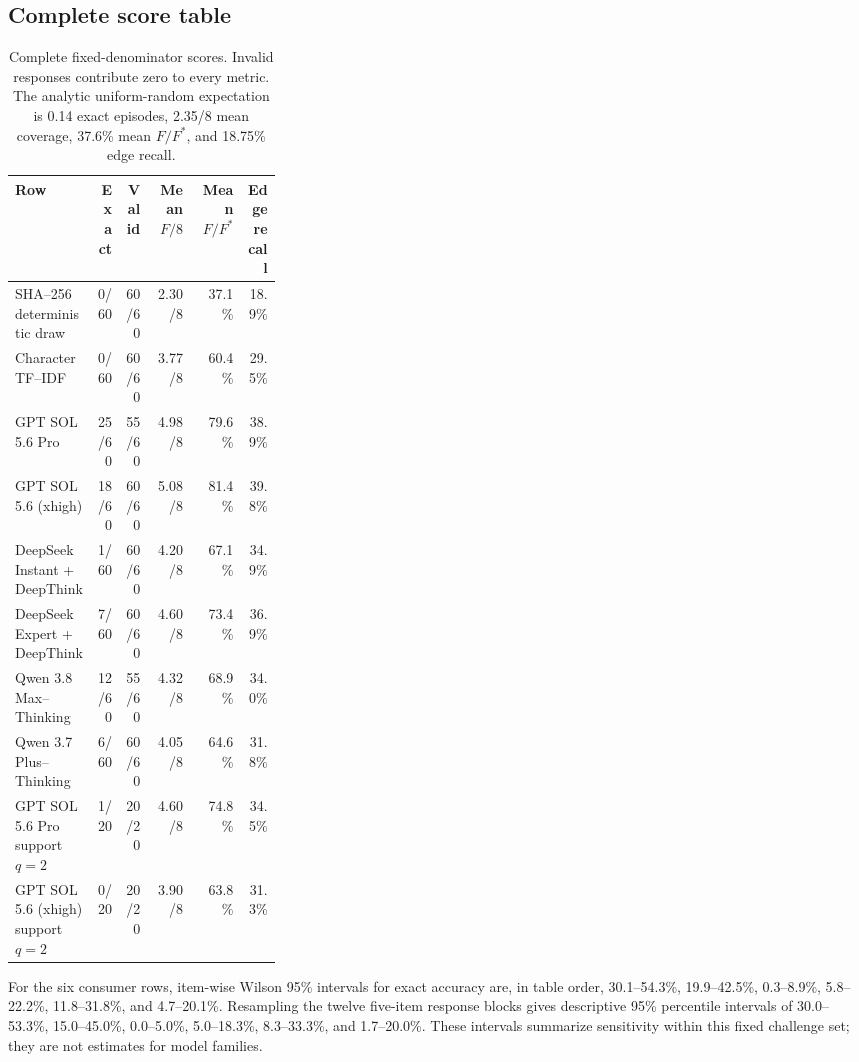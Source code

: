 \subsection{Complete score table}

\begin{table}[ht]
\centering\scriptsize
\setlength{\tabcolsep}{3.2pt}
\begin{tabular}{@{}p{0.31\linewidth}rrrrr@{}}
\toprule
Row & Exact & Valid & Mean $F/8$ & Mean $F/F^*$ & Edge recall \\
\midrule
SHA--256 deterministic draw & 0/60 & 60/60 & 2.30/8 & 37.1\% & 18.9\% \\
Character TF--IDF & 0/60 & 60/60 & 3.77/8 & 60.4\% & 29.5\% \\
GPT SOL 5.6 Pro & 25/60 & 55/60 & 4.98/8 & 79.6\% & 38.9\% \\
GPT SOL 5.6 (xhigh) & 18/60 & 60/60 & 5.08/8 & 81.4\% & 39.8\% \\
DeepSeek Instant + DeepThink & 1/60 & 60/60 & 4.20/8 & 67.1\% & 34.9\% \\
DeepSeek Expert + DeepThink & 7/60 & 60/60 & 4.60/8 & 73.4\% & 36.9\% \\
Qwen 3.8 Max--Thinking & 12/60 & 55/60 & 4.32/8 & 68.9\% & 34.0\% \\
Qwen 3.7 Plus--Thinking & 6/60 & 60/60 & 4.05/8 & 64.6\% & 31.8\% \\
GPT SOL 5.6 Pro support $q=2$ & 1/20 & 20/20 & 4.60/8 & 74.8\% & 34.5\% \\
GPT SOL 5.6 (xhigh) support $q=2$ & 0/20 & 20/20 & 3.90/8 & 63.8\% & 31.3\% \\
\bottomrule
\end{tabular}
\caption{Complete fixed-denominator scores.  Invalid responses contribute zero
to every metric.  The analytic uniform-random expectation is 0.14 exact
episodes, 2.35/8 mean coverage, 37.6\% mean $F/F^*$, and 18.75\% edge recall.}
\label{tab:supp-complete-results}
\end{table}

For the six consumer rows, item-wise Wilson 95\% intervals for exact accuracy
are, in table order, 30.1--54.3\%, 19.9--42.5\%, 0.3--8.9\%, 5.8--22.2\%,
11.8--31.8\%, and 4.7--20.1\%.  Resampling the twelve five-item response blocks
gives descriptive 95\% percentile intervals of 30.0--53.3\%, 15.0--45.0\%,
0.0--5.0\%, 5.0--18.3\%, 8.3--33.3\%, and 1.7--20.0\%.  These intervals
summarize sensitivity within this fixed challenge set; they are not estimates
for model families.

